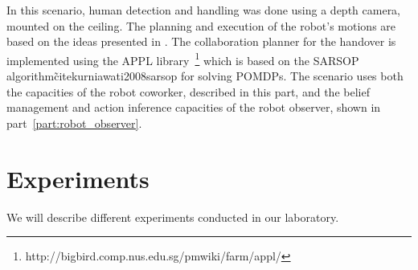 In this scenario, human detection and handling was done using a depth camera, mounted on the ceiling. The planning and execution of the robot's motions are based on the ideas presented in \cite{Sisbot2008,Mainprice2011,Pandey2010}. The collaboration planner for the handover is implemented using the APPL library~\footnote{http://bigbird.comp.nus.edu.sg/pmwiki/farm/appl/} which is based on the SARSOP algorithm\~cite{kurniawati2008sarsop} for solving POMDPs.
The scenario uses both the capacities of the robot coworker, described in this part, and the belief management and action inference capacities of the robot observer, shown in part~\ref{part:robot_observer}.

\section{Experiments}
\label{sec:coworker_experiments-experiment}
We will describe different experiments conducted in our laboratory.

